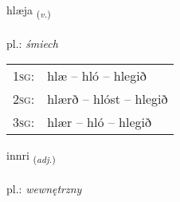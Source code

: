 \documentclass[frontgrid, backgrid]{flacards}\usepackage[]{graphicx}\usepackage[]{xcolor}
\begin{document}
\renewcommand{\flhead}{\vskip5pt \fboxsep=0pt {\small\bfseries\footnotesize Sagnorð | Verb}}
\renewcommand{\fcfoot}{\vskip5pt \fboxsep=0pt \hspace{2pt}{\small\bfseries\footnotesize 2K}}

\renewcommand{\blhead}{\vskip5pt {\small\bfseries\footnotesize Sagnorð | Verb }}
\renewcommand{\bcfoot}{\vskip5pt \hspace{2pt}{\small\bfseries\footnotesize 2K}}


{hlæja \small{\textsubscript{(\textit{v.})}} \\[1ex] %
\textphonetic{[l̥aiːja]} \\
pl.: \emph{śmiech} \\  [2ex]
\renewcommand*{\arraystretch}{0.8}
\begin{tabular}{p{1cm}l}
\textsc{1sg}: & hlæ -- hló -- hlegið \\ 
\textsc{2sg}: & hlærð -- hlóst -- hlegið \\ 
\textsc{3sg}: & hlær -- hló -- hlegið \\ 
\end{tabular}
}

\renewcommand{\flhead}{\vskip5pt \fboxsep=0pt {\small\bfseries\footnotesize Lýsingarorð | Adjective}}
\renewcommand{\fcfoot}{\vskip5pt \fboxsep=0pt \hspace{2pt}{\small\bfseries\footnotesize 2K}}

\renewcommand{\blhead}{\vskip5pt {\small\bfseries\footnotesize Lýsingarorð | Adjective }}
\renewcommand{\bcfoot}{\vskip5pt \hspace{2pt}{\small\bfseries\footnotesize 2K}}


{innri \small{\textsubscript{(\textit{adj.})}} \\[1ex] %
\textphonetic{[ɪnrɪ]} \\
pl.: \emph{wewnętrzny} \\  [2ex]
\renewcommand*{\arraystretch}{0.8}
}
\end{document}
